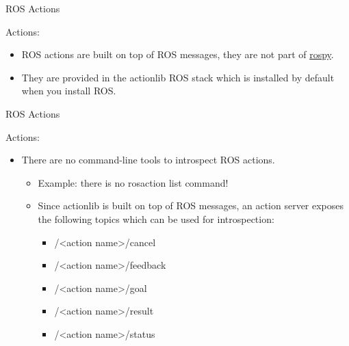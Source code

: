\documentclass{beamer}
\begin{document}
\begin{frame}{ROS Actions}
    
    {\huge Actions:}
    \vspace{0.2cm}
    \begin{itemize}
        
        
        \item ROS actions are built on top of ROS messages, they are not part of {\ttfamily \colorbox{gray!30!white}{\href{https://docs.ros.org/kinetic/api/rospy/html/}{rospy}}}. 
        
        \vspace{3mm}
        
        \item They are provided in the {\ttfamily \colorbox{gray!30!white}{actionlib}} ROS stack which is installed by default when you install ROS.
       
    \end{itemize}  
\end{frame}


\begin{frame}{ROS Actions}
    
    {\huge Actions:}
    \vspace{0.2cm}
    \begin{itemize}
               
        \item There are no command-line tools to introspect ROS actions.
        
        \begin{itemize}
            \item Example: there is no {\ttfamily \colorbox{gray!30!white}{rosaction list}} command!
            \item Since {\ttfamily \colorbox{gray!30!white}{actionlib}} is built on top of ROS messages, an action server exposes the following topics which can be used for introspection:
            
            \begin{itemize}
                \item {\ttfamily /<action name>/cancel}
                \item {\ttfamily /<action name>/feedback}
                \item {\ttfamily /<action name>/goal}
                \item {\ttfamily /<action name>/result}
                \item {\ttfamily /<action name>/status}
            \end{itemize}
            
        \end{itemize}
        
        
    \end{itemize}  
\end{frame}
\end{document}
